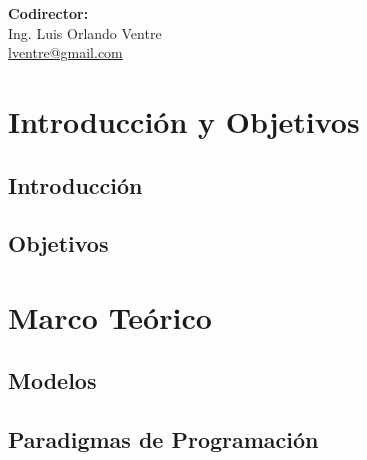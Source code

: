 \documentclass{report}
\newcounter{definitionsCounter}
\begin{document}
\begin{titlepage}
\begin{flushright}
       \vspace{0.7cm}
           {\Large \textbf{Codirector: } } \hspace*{5.9cm} \\ 
           {\Large Ing. Luis Orlando Ventre \\
           \href{mailto:lventre@gmail.com}{lventre@gmail.com} } \\
     \end{flushright}
\end{titlepage}

    \afterpage{\blankpage}
    

	
    \tableofcontents

    \listoffigures
    \listoftables
    \afterpage{\blankpage}

    \setcounter{definitionsCounter}{0}
    
    \part{Introducción y Objetivos} \setcounter{page}{1}
        \chapter{Introducción}
        
        \chapter{Objetivos}
        
    \part{Marco Teórico}
        \label{cap:marco_teorico}
        
        \chapter{Modelos}
            \label{cap:modelos}
            
        \chapter{Paradigmas de Programación}
            \label{cap:paradigmas_programacion}
            
            
            
\end{document}
